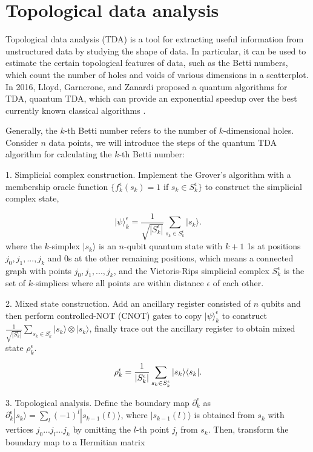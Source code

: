 \documentclass[aps,pra,twocolumn,superscriptaddress]{revtex4-1}
\begin{document}
\section{Topological data analysis}

Topological data analysis (TDA) \cite{carlsson2009topology} is a tool for extracting useful information from unstructured data by studying the shape of data. In particular, it can be used to estimate the certain topological features of data, such as the Betti numbers, which count the number of holes and voids of various dimensions in a scatterplot. In 2016, Lloyd, Garnerone, and Zanardi proposed a quantum algorithms for TDA, quantum TDA, which can provide an exponential speedup over the best currently known classical algorithms \cite{lloyd2016quantum}.

Generally, the $k$-th Betti number refers to the number of $k$-dimensional holes. Consider $n$ data points, we will introduce the steps of the quantum TDA algorithm for calculating the $k$-th Betti number:

1. Simplicial complex construction. Implement the Grover's algorithm with a membership oracle function $\{f_k^\epsilon ({s_k}) = 1$ if ${s_k} \in S_k^\epsilon \}$ to construct the simplicial complex state,

\[|\psi \rangle _k^\epsilon  = \frac{1}{{\sqrt {|S_k^\epsilon |} }}\sum_{{s_k} \in S_k^\epsilon } {|{s_k}\rangle }.\]
where the $k$-simplex $|s_k\rangle$ is an $n$-qubit quantum state with ${k+1}$ 1s at positions ${{j_0},{j_1},...,{j_k}}$ and 0s at the other remaining positions, which means a connected graph with points ${{j_0},{j_1},...,{j_k}}$, and the Vietoris-Rips simplicial complex ${S_k^\epsilon }$ is the set of ${k}$-simplices where all points are within distance ${\epsilon }$ of each other.

2. Mixed state construction. Add an ancillary register consisted of $n$ qubits and then perform controlled-NOT (CNOT) gates to copy $|\psi \rangle _k^\epsilon$ to construct ${\frac{1}{{\sqrt {|S_k^\epsilon |} }}\sum\limits_{{s_k} \in S_k^\epsilon } {|{s_k}\rangle }  \otimes |{s_k}\rangle }$, finally trace out the ancillary register to obtain mixed state ${\rho _k^\epsilon }$.

\[{\rho _k^\epsilon  = \frac{1}{|S_k^\epsilon |}\sum_{{s_k} \in S_k^\epsilon } {|{s_k}} \rangle \langle {s_k}{\rm{|}}}.\]

3. Topological analysis. Define the boundary map ${\partial _k^\epsilon }$ as $\partial _k^\epsilon |{s_k}\rangle  = \sum\limits_l {{{( - 1)}^l}} |{s_{k - 1}}(l)\rangle$, where ${|{s_{k - 1}}(l)\rangle }$ is obtained from ${{s_k}}$ with vertices ${{j_0}...{j_l}...{j_k}}$ by omitting the ${l}$-th point ${{j_l}}$ from ${{s_k}}$. Then, transform the boundary map to a Hermitian matrix
\end{document}
